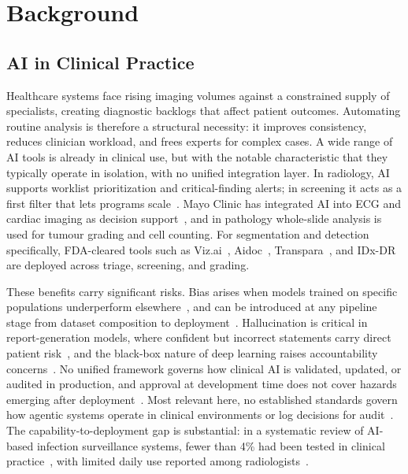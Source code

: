 \documentclass[conference]{IEEEtran}
\begin{document}
\section{Background}
\label{sec:background}

\subsection{AI in Clinical Practice}
Healthcare systems face rising imaging volumes against a constrained supply of specialists, creating diagnostic backlogs that affect patient outcomes. Automating routine analysis is therefore a structural necessity: it improves consistency, reduces clinician workload, and frees experts for complex cases. A wide range of AI tools is already in clinical use, but with the notable characteristic that they typically operate in isolation, with no unified integration layer. In radiology, AI supports worklist prioritization and critical-finding alerts; in screening it acts as a first filter that lets programs scale~\cite{ruamviboonsuk2022retinopathy, wolf2024access}. Mayo Clinic has integrated AI into ECG and cardiac imaging as decision support~\cite{mayoclinic-ai-cardiology}, and in pathology whole-slide analysis is used for tumour grading and cell counting. For segmentation and detection specifically, FDA-cleared tools such as Viz.ai~\cite{vizai}, Aidoc~\cite{aidoc}, Transpara~\cite{transpara}, and IDx-DR~\cite{idxdr} are deployed across triage, screening, and grading.

These benefits carry significant risks. Bias arises when models trained on specific populations underperform elsewhere~\cite{mittermaier2023bias}, and can be introduced at any pipeline stage from dataset composition to deployment~\cite{kocak2025bias}. Hallucination is critical in report-generation models, where confident but incorrect statements carry direct patient risk~\cite{griot2025metacognition}, and the black-box nature of deep learning raises accountability concerns~\cite{kondylakis2026futureai}. No unified framework governs how clinical AI is validated, updated, or audited in production, and approval at development time does not cover hazards emerging after deployment~\cite{jia2025deployment}. Most relevant here, no established standards govern how agentic systems operate in clinical environments or log decisions for audit~\cite{trustworthyai2025}. The capability-to-deployment gap is substantial: in a systematic review of AI-based infection surveillance systems, fewer than 4\% had been tested in clinical practice~\cite{cozzolino2025surveillance}, with limited daily use reported among radiologists~\cite{kondylakis2026futureai, ce2024perceptions}.
\end{document}

